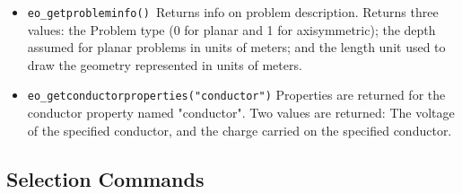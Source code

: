 \begin{itemize}
For example, if one wanted to plot $V $ to the screen with 200 points evaluated
to make the graph, the command would be: \newline
\texttt{eo\_makeplot(0,200) } \newline
To write the data to disk instead of plotting it, the command would be of
the form:\texttt{ } \newline
\texttt{eo\_makeplot(0,200,"c:temp.txt")} \newline


\item \texttt{eo\_getprobleminfo() }Returns info on problem description. Returns three
values: the Problem type (0 for planar and 1 for axisymmetric); the depth
assumed for planar problems in units of meters; and the length unit used to draw the
geometry represented in units of meters.

\item \texttt{eo\_getconductorproperties("conductor")} Properties are returned for the
conductor property named "conductor". Two values are returned: The voltage
of the specified conductor, and the charge carried on the specified
conductor.
\end{itemize}

\subsection{Selection Commands}

